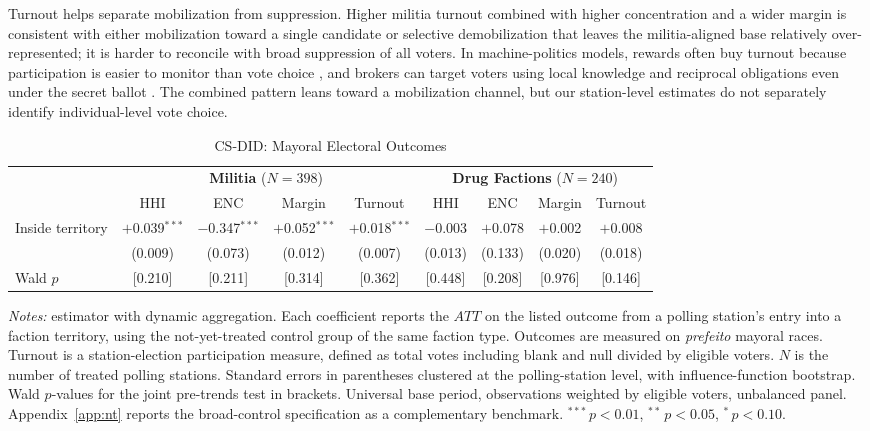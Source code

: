\documentclass[11pt]{article}
\newcommand{\tabnotes}[1]{\par\vspace{3pt}\noindent\begin{minipage}{\linewidth}\footnotesize #1\end{minipage}}
\begin{document}
Turnout helps separate mobilization from suppression. Higher militia turnout combined with higher concentration and a wider margin is consistent with either mobilization toward a single candidate or selective demobilization that leaves the militia-aligned base relatively over-represented; it is harder to reconcile with broad suppression of all voters. In machine-politics models, rewards often buy turnout because participation is easier to monitor than vote choice \citep{nichter2008turnout}, and brokers can target voters using local knowledge and reciprocal obligations even under the secret ballot \citep{finan2012reciprocity}. The combined pattern leans toward a mobilization channel, but our station-level estimates do not separately identify individual-level vote choice.

\begin{table}[H]
\centering
\caption{CS-DID: Mayoral Electoral Outcomes}\label{tab:csdid_main}
\footnotesize
\begin{tabular}{@{}l cccc cccc@{}}
\toprule
 & \multicolumn{4}{c}{\textbf{Militia} ($N = 398$)} & \multicolumn{4}{c}{\textbf{Drug Factions} ($N = 240$)} \\
\cmidrule(lr){2-5} \cmidrule(lr){6-9}
 & HHI & ENC & Margin & Turnout & HHI & ENC & Margin & Turnout \\
\midrule
Inside territory & $+$0.039$^{***}$ & $-$0.347$^{***}$ & $+$0.052$^{***}$ & $+$0.018$^{***}$ & $-$0.003 & $+$0.078 & $+$0.002 & $+$0.008 \\
                 & (0.009) & (0.073) & (0.012) & (0.007) & (0.013) & (0.133) & (0.020) & (0.018) \\
Wald $p$         & [0.210] & [0.211] & [0.314] & [0.362] & [0.448] & [0.208] & [0.976] & [0.146] \\
\bottomrule
\end{tabular}
\tabnotes{\textit{Notes:} \citet{callaway2021did} estimator with dynamic aggregation. Each coefficient reports the $\widehat{ATT}$ on the listed outcome from a polling station's entry into a faction territory, using the not-yet-treated control group of the same faction type. Outcomes are measured on \emph{prefeito} mayoral races. Turnout is a station-election participation measure, defined as total votes including blank and null divided by eligible voters. $N$ is the number of treated polling stations. Standard errors in parentheses clustered at the polling-station level, with influence-function bootstrap. Wald $p$-values for the joint pre-trends test in brackets. Universal base period, observations weighted by eligible voters, unbalanced panel. Appendix~\ref{app:nt} reports the broad-control specification as a complementary benchmark. $^{***}\,p<0.01$, $^{**}\,p<0.05$, $^{*}\,p<0.10$.}
\end{table}
\end{document}
